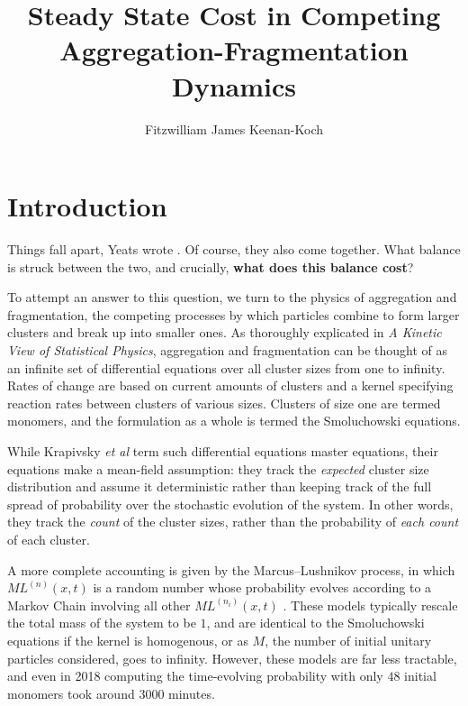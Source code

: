 \documentclass[fleqn,10pt]{wlscirep}
\title{Steady State Cost in Competing Aggregation-Fragmentation Dynamics}
\author[1,*]{Fitzwilliam James Keenan-Koch}
\affil[1]{Vermont Complex Systems Institute, University of Vermont, Burlington, VT, USA}
\affil[*]{fkeenank@uvm.edu}
\begin{document}
\flushbottom
\maketitle
\thispagestyle{empty}


\section{Introduction}
Things fall apart, Yeats wrote \cite{zotero-item-4381}.
Of course, they also come together.
What balance is struck between the two, and crucially, \textbf{what does this balance cost}?

To attempt an answer to this question, we turn to the physics of aggregation and fragmentation, the competing processes by which  particles combine to form larger clusters and break up into smaller ones.
As thoroughly explicated  in \textit{A Kinetic View of Statistical Physics}, aggregation and fragmentation can be thought of as an infinite set of differential equations over all cluster sizes from one to infinity\cite{krapivskyKineticViewStatistical2010}.
Rates of change are based on current amounts of clusters and a kernel specifying reaction rates between clusters of various sizes.
Clusters of size one are termed monomers, and the formulation as a whole is termed the Smoluchowski equations.

While Krapivsky \textit{et al} term such differential equations master equations, their equations make a mean-field assumption:  they track the  \textit{expected} cluster size distribution and assume it deterministic rather than keeping track of the full spread of probability over the stochastic evolution of the system.
In other words, they track the \textit{count} of the cluster sizes, rather than the probability of \textit{each count} of each cluster.

A more complete accounting is given by the Marcus--Lushnikov process, in which $ ML^{(n)}(x, t) $ is a random number whose probability evolves according to a Markov Chain involving all other $ ML^{(n_i)}(x, t)  $  \cite{aldousDeterministicStochasticModels1999}.
These models typically rescale the total mass of the system to be $ 1 $, and are identical to the Smoluchowski equations if the kernel is homogenous, or as $ M $, the number of initial unitary particles considered, goes to infinity.
However, these models are far less tractable, and even in 2018 computing the time-evolving probability with only $ 48 $ initial monomers took around $ 3000 $ minutes\cite{manuchehrfarEvolutionCoagulationFragmentationStochastic2019}.
\end{document}
